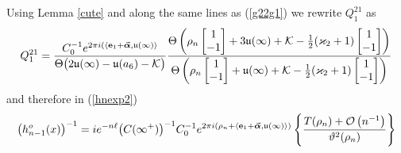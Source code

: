 \documentclass[10pt,oneside,reqno]{amsart}
\numberwithin{equation}{section}
\def\eqref#1{(\ref{#1})}
\begin{document}
Using Lemma \ref{cute} and along the same lines as \eqref{g22g1} we rewrite $Q_1^{21}$ as
\begin{equation*}
  Q_1^{21}=\frac{C_0^{-1}e^{2\pi i(\langle {\bf e}_1+\vec{\boldsymbol \alpha},\mathfrak{u}(\infty)\rangle}}{\Theta\big(2\mathfrak{u}(\infty)-\mathfrak{u}(a_6)-\mathcal{K}\big)}
  \frac{\Theta\left(\rho_n\begin{bmatrix}
                      1\\
-1\\
                     \end{bmatrix}+3\mathfrak{u}(\infty)+\mathcal{K}-\frac{1}{2}(\varkappa_2+1)\begin{bmatrix}
1\\
-1\\
\end{bmatrix}\right)
}{\Theta\left(\rho_n\begin{bmatrix}
                      1\\
-1\\
                     \end{bmatrix}+\mathfrak{u}(\infty)+\mathcal{K}-\frac{1}{2}(\varkappa_2+1)\begin{bmatrix}
1\\
-1\\
\end{bmatrix}\right)}
\end{equation*}
and therefore in \eqref{hnexp2}
\begin{equation}
\label{h0n1}
  \big(h_{n-1}^o(x)\big)^{-1} = ie^{-n\ell}\big(C(\infty^+)\big)^{-1}C_0^{-1}e^{2\pi i(\rho_n+\langle{\bf e}_1+\vec{\boldsymbol \alpha},\mathfrak{u}(\infty)\rangle)}
\left\{\frac{T(\rho_n)+\mathcal O\left(n^{-1}\right)}{\vartheta^2(\rho_n)}\right\}
\end{equation}
\end{document}
